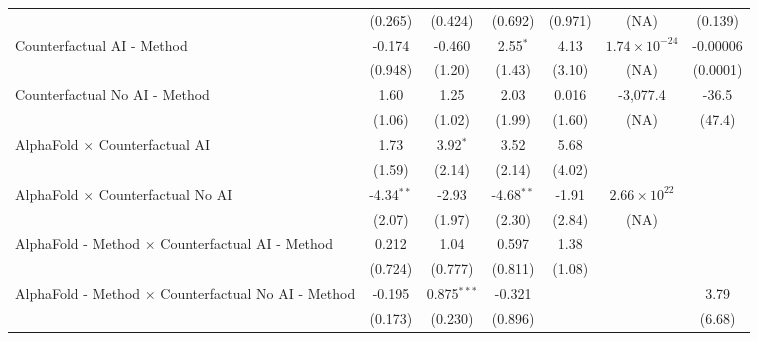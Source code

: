 \begin{tabular}{lcccccc}
                                                              & (0.265)      & (0.424)       & (0.692)      & (0.971)       & (NA)                   & (0.139)\\   
   Counterfactual AI - Method                                 & -0.174       & -0.460        & 2.55$^{*}$   & 4.13          & $1.74\times 10^{-24}$  & -0.00006\\   
                                                              & (0.948)      & (1.20)        & (1.43)       & (3.10)        & (NA)                   & (0.0001)\\   
   Counterfactual No AI - Method                              & 1.60         & 1.25          & 2.03         & 0.016         & -3,077.4               & -36.5\\   
                                                              & (1.06)       & (1.02)        & (1.99)       & (1.60)        & (NA)                   & (47.4)\\   
   AlphaFold $\times$ Counterfactual AI                       & 1.73         & 3.92$^{*}$    & 3.52         & 5.68          &                        &   \\   
                                                              & (1.59)       & (2.14)        & (2.14)       & (4.02)        &                        &   \\   
   AlphaFold $\times$ Counterfactual No AI                    & -4.34$^{**}$ & -2.93         & -4.68$^{**}$ & -1.91         & $2.66\times 10^{22}$   &   \\   
                                                              & (2.07)       & (1.97)        & (2.30)       & (2.84)        & (NA)                   &   \\   
   AlphaFold - Method $\times$ Counterfactual AI - Method     & 0.212        & 1.04          & 0.597        & 1.38          &                        &   \\   
                                                              & (0.724)      & (0.777)       & (0.811)      & (1.08)        &                        &   \\   
   AlphaFold - Method $\times$ Counterfactual No AI - Method  & -0.195       & 0.875$^{***}$ & -0.321       &               &                        & 3.79\\   
                                                              & (0.173)      & (0.230)       & (0.896)      &               &                        & (6.68)\\   

\end{tabular}

